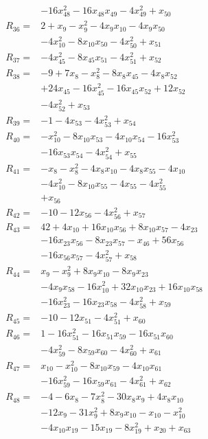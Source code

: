 \begin{align*}
&-16x_{48}^{2} -16x_{48}x_{49} -4x_{49}^{2} +x_{50}\\[3pt]
R_{36}={}&2 +x_{9} -x_{9}^{2} -4x_{9}x_{10} -4x_{9}x_{50}\\
&-4x_{10}^{2} -8x_{10}x_{50} -4x_{50}^{2} +x_{51}\\[3pt]
R_{37}={}&-4x_{45}^{2} -8x_{45}x_{51} -4x_{51}^{2} +x_{52}\\[3pt]
R_{38}={}&-9 +7x_{8} -x_{8}^{2} -8x_{8}x_{45} -4x_{8}x_{52}\\
&+24x_{45} -16x_{45}^{2} -16x_{45}x_{52} +12x_{52}\\
&-4x_{52}^{2} +x_{53}\\[3pt]
R_{39}={}&-1 -4x_{53} -4x_{53}^{2} +x_{54}\\[3pt]
R_{40}={}&-x_{10}^{2} -8x_{10}x_{53} -4x_{10}x_{54} -16x_{53}^{2}\\
&-16x_{53}x_{54} -4x_{54}^{2} +x_{55}\\[3pt]
R_{41}={}&-x_{8} -x_{8}^{2} -4x_{8}x_{10} -4x_{8}x_{55} -4x_{10}\\
&-4x_{10}^{2} -8x_{10}x_{55} -4x_{55} -4x_{55}^{2}\\
&+x_{56}\\[3pt]
R_{42}={}&-10 -12x_{56} -4x_{56}^{2} +x_{57}\\[3pt]
R_{43}={}&42 +4x_{10} +16x_{10}x_{56} +8x_{10}x_{57} -4x_{23}\\
&-16x_{23}x_{56} -8x_{23}x_{57} -x_{46} +56x_{56}\\
&-16x_{56}x_{57} -4x_{57}^{2} +x_{58}\\[3pt]
R_{44}={}&x_{9} -x_{9}^{2} +8x_{9}x_{10} -8x_{9}x_{23}\\
&-4x_{9}x_{58} -16x_{10}^{2} +32x_{10}x_{23} +16x_{10}x_{58}\\
&-16x_{23}^{2} -16x_{23}x_{58} -4x_{58}^{2} +x_{59}\\[3pt]
R_{45}={}&-10 -12x_{51} -4x_{51}^{2} +x_{60}\\[3pt]
R_{46}={}&1 -16x_{51}^{2} -16x_{51}x_{59} -16x_{51}x_{60}\\
&-4x_{59}^{2} -8x_{59}x_{60} -4x_{60}^{2} +x_{61}\\[3pt]
R_{47}={}&x_{10} -x_{10}^{2} -8x_{10}x_{59} -4x_{10}x_{61}\\
&-16x_{59}^{2} -16x_{59}x_{61} -4x_{61}^{2} +x_{62}\\[3pt]
R_{48}={}&-4 -6x_{8} -7x_{8}^{2} -30x_{8}x_{9} +4x_{8}x_{10}\\
&-12x_{9} -31x_{9}^{2} +8x_{9}x_{10} -x_{10} -x_{10}^{2}\\
&-4x_{10}x_{19} -15x_{19} -8x_{19}^{2} +x_{20} +x_{63}\\[3pt]

\end{align*}
